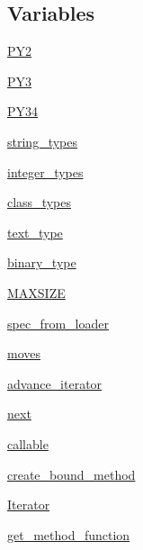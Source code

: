 \subsection*{Variables}
\begin{DoxyCompactItemize}
\item 
\hyperlink{namespacepip_1_1__vendor_1_1six_a9350897613e91252a85a422f71dbe82b}{P\+Y2}
\item 
\hyperlink{namespacepip_1_1__vendor_1_1six_a2d0968030ca68e271e16704401f32944}{P\+Y3}
\item 
\hyperlink{namespacepip_1_1__vendor_1_1six_abe258e9222b633c0869c130b4a3b54c3}{P\+Y34}
\item 
\hyperlink{namespacepip_1_1__vendor_1_1six_a0eb1dbe8d13b437c8566a1d2c006c5f4}{string\+\_\+types}
\item 
\hyperlink{namespacepip_1_1__vendor_1_1six_a70941ea4073a731334cf96588faca393}{integer\+\_\+types}
\item 
\hyperlink{namespacepip_1_1__vendor_1_1six_a71a99e31ff6970bf2bb646a792addc03}{class\+\_\+types}
\item 
\hyperlink{namespacepip_1_1__vendor_1_1six_ae596ec9e1233790cc163e8a6c2c6e2e3}{text\+\_\+type}
\item 
\hyperlink{namespacepip_1_1__vendor_1_1six_a933b36580a3005c6d6d23763cb54cbea}{binary\+\_\+type}
\item 
\hyperlink{namespacepip_1_1__vendor_1_1six_aa867823d4a6e99caaab4a7838172d80a}{M\+A\+X\+S\+I\+ZE}
\item 
\hyperlink{namespacepip_1_1__vendor_1_1six_a78aecd3b565e2021ddd65042cfa9083f}{spec\+\_\+from\+\_\+loader}
\item 
\hyperlink{namespacepip_1_1__vendor_1_1six_ab7af8af0271815a41040981ffe3300f4}{moves}
\item 
\hyperlink{namespacepip_1_1__vendor_1_1six_ad91727d8c02ce6ec625e128715b03845}{advance\+\_\+iterator}
\item 
\hyperlink{namespacepip_1_1__vendor_1_1six_a35d162c68897d3b3b0c8c06e96cde541}{next}
\item 
\hyperlink{namespacepip_1_1__vendor_1_1six_ae29d87b35d4415c730a55a930fa315d9}{callable}
\item 
\hyperlink{namespacepip_1_1__vendor_1_1six_adf45659e733bf6360a3b13468daab613}{create\+\_\+bound\+\_\+method}
\item 
\hyperlink{namespacepip_1_1__vendor_1_1six_a319f1ad7815d11a55a2d7802419f98c0}{Iterator}
\item 
\hyperlink{namespacepip_1_1__vendor_1_1six_a20ecdfd097a8e7375111afd40f622eeb}{get\+\_\+method\+\_\+function}

\end{DoxyCompactItemize}

